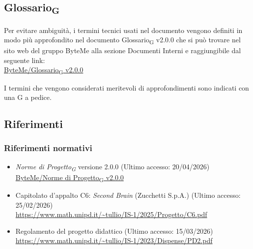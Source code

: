 \documentclass[11pt,a4paper]{article}
\newcommand{\gls}[1]{#1\textsubscript{G}}
\begin{document}
\subsection{\gls{Glossario}}
Per evitare ambiguità, i termini tecnici usati nel documento vengono definiti in modo più approfondito nel documento \gls{Glossario} v2.0.0 che si può trovare nel sito web del gruppo ByteMe alla sezione Documenti Interni e raggiungibile dal seguente link:\\
\href{https://byteme25.github.io/ByteMe/files.html}{ByteMe/\gls{Glossario} v2.0.0}

I termini che vengono considerati meritevoli di approfondimenti sono indicati con una G a pedice.

\subsection{Riferimenti}
\subsubsection{Riferimenti normativi}
\begin{itemize}
  \item \textit{\gls{Norme di Progetto}} versione 2.0.0 (Ultimo accesso: 20/04/2026)\\
  \href{https://byteme25.github.io/ByteMe/files.html}{ByteMe/\gls{Norme di Progetto} v2.0.0}
  \item Capitolato d'appalto C6: \textit{Second Brain} (Zucchetti S.p.A.) (Ultimo accesso: 25/02/2026)\\ 
  \url{https://www.math.unipd.it/~tullio/IS-1/2025/Progetto/C6.pdf}
  \item Regolamento del progetto didattico (Ultimo accesso: 15/03/2026)\\
        \url{https://www.math.unipd.it/~tullio/IS-1/2023/Dispense/PD2.pdf}
\end{itemize}
\end{document}
